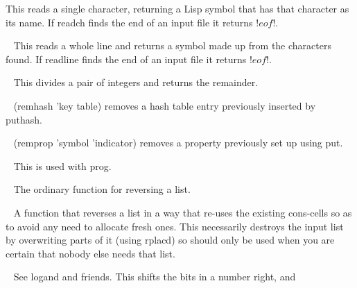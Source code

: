 \begin{description}
This reads a single character, returning a Lisp symbol that has that character
as its name. If {\tx readch} finds the end of an input file it returns {\tx !$eof!$}.
\item[{\tx readline~~~~~} \hspace{1cm} {\em function 0 args}]~\newline
This reads a whole line and returns a symbol made up from the characters
found. If {\tx readline} finds the end of an input file it returns
{\tx !$eof!$}.
\item[{\tx remainder~~~~} \hspace{1cm} {\em function 2 args}]~\newline
This divides a pair of integers and returns the remainder.
\item[{\tx remhash~~~~~~} \hspace{1cm} {\em function 2 args}]~\newline
{\tx (remhash 'key table)} removes a hash table entry previously
inserted by {\tx puthash}.
\item[{\tx remprop~~~~~~} \hspace{1cm} {\em function 2 args}]~\newline
{\tx (remprop 'symbol 'indicator)} removes a property previously
set up using {\tx put}.
\item[{\tx return~~~~~~~} \hspace{1cm} {\em function 1 arg}]~\newline
This is used with {\tx prog}.
\item[{\tx reverse~~~~~~} \hspace{1cm} {\em function 1 arg}]~\newline
The ordinary function for reversing a list.
\item[{\tx reversip~~~~~} \hspace{1cm} {\em function 1 arg}]~\newline
A function that reverses a list in a way that re-uses the existing {\tx cons}-cells
so as to avoid any need to allocate fresh ones. This necessarily destroys
the input list by overwriting parts of it (using {\tx rplacd})
so should only be used when you are certain that nobody else needs that list.
\item[{\tx rightshift~~~} \hspace{1cm} {\em function 2 args}]~\newline
See {\tx logand} and friends. This shifts the bits in a number right, and

\end{description}
